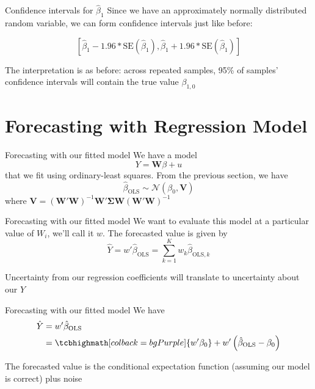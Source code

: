 \documentclass[aspectratio=169,t,11pt,table]{beamer}
\begin{document}
\begin{frame}{Confidence intervals for $\hat{\beta}_1$}
  Since we have an approximately normally distributed random variable, we can form confidence intervals just like before:

  $$
    \left[
      \hat{\beta}_1 - 1.96 * \text{SE}(\hat{\beta}_1), 
      \hat{\beta}_1 + 1.96 * \text{SE}(\hat{\beta}_1)
    \right]
  $$

  \pause
  \bigskip
  The interpretation is as before: across repeated samples, 95\% of samples' confidence intervals will contain the true value $\beta_{1, 0}$
\end{frame}

\section{Forecasting with Regression Model}
 
\begin{frame}{Forecasting with our fitted model}
  We have a model 
  $$
    Y = \bm{W} \beta + u
  $$
  that we fit using ordinary-least squares. From the previous section, we have 
  $$
    \hat{\beta}_{\text{OLS}} \sim 
    \mathcal{N}\left( \beta_0, \bm{V} \right)
  $$
  where $\bm{V} = \left(\bm{W}' \bm{W} \right)^{-1} \bm{W}' \bm{\Sigma} \bm{W} \left(\bm{W}' \bm{W} \right)^{-1}$
\end{frame}

\begin{frame}{Forecasting with our fitted model}
  We want to evaluate this model at a particular value of $W_i$, we'll call it $w$. The forecasted value is given by
  $$
    \hat{Y} = w' \hat{\beta}_{\text{OLS}} = \sum_{k=1}^K w_{k} \hat{\beta}_{\text{OLS}, k}
  $$

  \bigskip
  Uncertainty from our regression coefficients will translate to uncertainty about our $\hat{Y}$
\end{frame}

\begin{frame}{Forecasting with our fitted model}
  We have 
  \begin{align*}
    \hat{Y} &= w' \hat{\beta}_{\text{OLS}} \\
    &= \tcbhighmath[colback = bgPurple]{w' \beta_0} + w' \left( \hat{\beta}_{\text{OLS}} - \beta_0 \right)
  \end{align*}


  \bigskip
  The forecasted value is the conditional expectation function (assuming our model is correct) plus noise
\end{frame}
\end{document}
